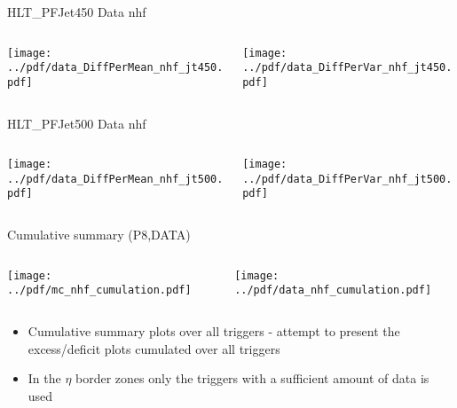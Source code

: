 \documentclass[9pt]{beamer}
\begin{document}
\begin{frame}[t]{HLT\_PFJet450 Data nhf}
\begin{columns}[T]
  \begin{column}{.5\textwidth}
  \texttt{[image: ../pdf/data\_DiffPerMean\_nhf\_jt450.pdf]}
  \end{column}
  \begin{column}{.5\textwidth}
  \texttt{[image: ../pdf/data\_DiffPerVar\_nhf\_jt450.pdf]}
  \end{column}
\end{columns}
\end{frame}

\begin{frame}[t]{HLT\_PFJet500 Data nhf}
\begin{columns}[T]
  \begin{column}{.5\textwidth}
  \texttt{[image: ../pdf/data\_DiffPerMean\_nhf\_jt500.pdf]}
  \end{column}
  \begin{column}{.5\textwidth}
  \texttt{[image: ../pdf/data\_DiffPerVar\_nhf\_jt500.pdf]}
  \end{column}
\end{columns}
\end{frame}

\begin{frame}[t]{Cumulative summary (P8,DATA)}
\begin{columns}[T]
  \begin{column}{.5\textwidth}
  \texttt{[image: ../pdf/mc\_nhf\_cumulation.pdf]}
  \end{column}
  \begin{column}{.5\textwidth}
  \texttt{[image: ../pdf/data\_nhf\_cumulation.pdf]}
  \end{column}
\end{columns}
\begin{itemize}
 \item Cumulative summary plots over all triggers - attempt to present the excess/deficit plots cumulated over all triggers
 \item In the $\eta$ border zones only the triggers with a sufficient amount of data is used
\end{itemize}
\end{frame}
\end{document}
